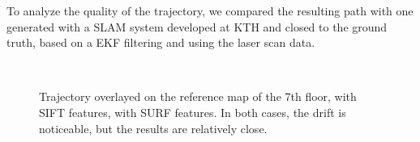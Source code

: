 \clearpage
To analyze the quality of the trajectory, we compared the resulting path with one generated with a \gls{SLAM} system developed at KTH and closed to the ground truth, based on a \gls{EKF} filtering and using the laser scan data.
\begin{figure}[H]
\centering
{} \\
\caption{Trajectory overlayed on the reference map of the 7th floor, \protect{} with SIFT features, \protect{} with SURF features. In both cases, the drift is noticeable, but the results are relatively close.}
\label{fig:plan_cvap}
\end{figure}

